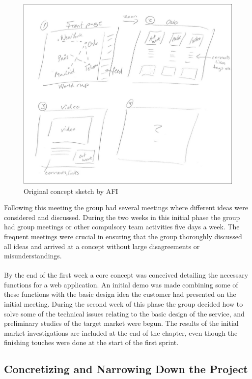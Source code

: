 \begin{figure}[ht!]
  \includegraphics[width=\linewidth]{./PreliminaryStudies/img/conceptSketch}
  \caption{Original concept sketch by AFI}
  \label{fig:PrelimWorkSketch}
\end{figure}

Following this meeting the group had several meetings where different ideas were considered and discussed. During the two weeks in this initial phase the group had group meetings or other compulsory team activities five days a week. The frequent meetings were crucial in ensuring that the group thoroughly discussed all ideas and arrived at a concept without large disagreements or misunderstandings.
\paragraph{} By the end of the first week a core concept was conceived detailing the necessary functions for a web application. An initial demo was made combining some of these functions with the basic design idea the customer had presented on the initial meeting. During the second week of this phase the group decided how to solve some of the technical issues relating to the basic design of the service, and preliminary studies of the target market were begun. The results of the initial market investigations are included at the end of the chapter, even though the finishing touches were done at the start of the first sprint.

\subsection{Concretizing and Narrowing Down the Project}
\label{subsec:PrelimWorkConcret}

